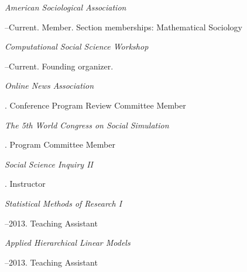 \documentclass[11pt]{article}
\begin{document}
\medskip
\noindent\emph{American Sociological Association \vspace{0.01in}}

--Current. Member. Section memberships: Mathematical Sociology

\bigskip
{}
\medskip

\noindent\emph{Computational Social Science Workshop \vspace{0.01in}}

--Current. Founding organizer.

\medskip

\noindent\emph{Online News Association \vspace{0.01in}}

. Conference Program Review Committee Member

\medskip

\noindent\emph{The 5th World Congress on Social Simulation \vspace{0.01in}}

. Program Committee Member

\bigskip
{}
\medskip

\noindent\emph{Social Science Inquiry II \vspace{0.01in}}

. Instructor

\medskip


\noindent\emph{Statistical Methods of Research I \vspace{0.01in}}

--2013. Teaching Assistant
\medskip

\noindent\emph{Applied Hierarchical Linear Models \vspace{0.01in}}

--2013. Teaching Assistant
\end{document}
